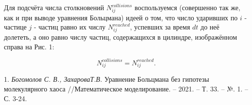 \documentclass{vzmsthesis}
\begin{document}
Для подсчёта числа столкновений $N_{ij}^{collisions}$  воспользуемся  (совершенно так же, как и при выводе уравнения Больцмана)
идеей о том, что число ударивших по $ i $ - частице  $ j $ - частиц равно их числу $N_{ij}^{reached}$, успевших за  время $ dt $ до неё долететь,
а оно равно числу частиц, содержащихся в  цилиндре, изображённом справа на Рис. 1: %

 \begin{equation}\label{Nreached}	
 N_{ij}^{collisions} = N_{ij}^{reached}.
\end{equation}




\litlist

1. {\it Богомолов С. В., ЗахароваТ.В.}
 Уравнение Больцмана без гипотезы молекулярного хаоса //Математическое моделирование. – 2021. – Т. 33. – №. 1. – С. 3-24.
\end{document}
